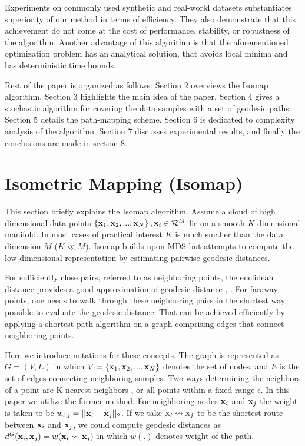 \documentclass[10pt,journal,cspaper,compsoc]{IEEEtran}
\begin{document}
Experiments on commonly used synthetic and real-world datasets substantiates superiority of our method in terms of efficiency. They also demonstrate that this achievement do not come at the cost of performance, stability, or robustness of the algorithm. Another advantage of this algorithm is that the aforementioned optimization problem has an analytical solution, that avoids local minima and has deterministic time bounds.

Rest of the paper is organized as follows: Section 2 overviews the Isomap algorithm. Section 3 highlights the main idea of the paper. Section 4 gives a stochastic algorithm for covering the data samples with a set of geodesic paths. Section 5 details the path-mapping scheme. Section 6 is dedicated to complexity analysis of the algorithm. Section 7 discusses experimental results, and finally the conclusions are made in section 8.




\section{Isometric Mapping (Isomap)}
This section briefly explains the Isomap algorithm. Assume a cloud of high dimensional data points $\left\{{\bf x}_1,{\bf x}_2,...,{\bf x}_N\right\},{\bf x}_i \in \mathcal{R}^M$ lie on a smooth $K$-dimensional manifold. In most cases of practical interest $K$ is  much smaller than the data dimension $M$ ($K\ll M$). Isomap builds upon MDS but attempts to compute the low-dimensional representation by estimating pairwise geodesic distances.

For sufficiently close pairs, referred to as neighboring points, the euclidean distance provides a good approximation of geodesic distance \cite{bernstein2000graph}, \cite{balasubramanian2002isomap}. For faraway points, one needs to walk through these neighboring pairs in the shortest way possible to evaluate the geodesic distance. That can be achieved efficiently by applying a shortest path algorithm on a graph comprising edges that connect neighboring points.

Here we introduce notations for these concepts. The graph is represented as $G=(V,E)$ in which $V=\left\{{\bf x}_1,{\bf x}_2,...,{\bf x}_N\right\}$ denotes the set of nodes, and $E$ is the set of edges connecting neighboring samples. Two ways determining the neighbors of a point are K-nearest neighbors \cite{seidl1998optimal}, or all points within a fixed range $\epsilon$. In this paper we utilize the former method. For neighboring nodes ${\bf x}_i$ and ${\bf x}_j$ the weight is taken to be $w_{i,j} = ||{\bf x}_i-{\bf x}_j||_2$. If we take ${\bf x}_i \leadsto {\bf x}_j$ to be the shortest route between ${\bf x}_i$ and ${\bf x}_j$, we could compute geodesic distances as $d^G({\bf x}_i,{\bf x}_j) = w({\bf x}_i \leadsto {\bf x}_j)$ in which $w(.)$ denotes weight of the path.
\end{document}
